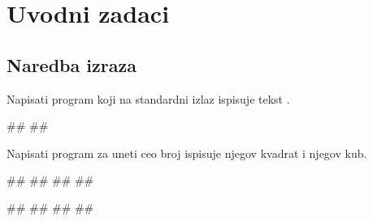 \renewcommand{\chaptermark}[1]{\markboth{\thechapter\ #1}{#1}}
\renewcommand{\sectionmark}[1]{\markright{\thesection\ #1}}


\chapter{Uvodni zadaci}


\setcounter{page}{1}


\section{Naredba izraza}

\begin{Exercise}[label=v1.1_01] 
Napisati program koji na standardni izlaz ispisuje tekst .

\begin{miditest}
\begin{upotreba}{1}
#\naslovInt#
##
\end{upotreba}
\end{miditest}

\end{Exercise}
\ifresenja
\begin{Answer}[ref=v1.1_01]
\end{Answer}
\fi




\begin{Exercise}[label=p1.1_01] 
Napisati program za uneti ceo broj ispisuje njegov kvadrat i njegov kub. 

\begin{miditest}
\begin{upotreba}{1}
#\naslovInt#
##
##
##
\end{upotreba}
\end{miditest}
\begin{miditest}
\begin{upotreba}{2}
#\naslovInt#
##
##
##
\end{upotreba}
\end{miditest}

\end{Exercise}
\ifresenja
\begin{Answer}[ref=p1.1_01]
\end{Answer}
\fi


